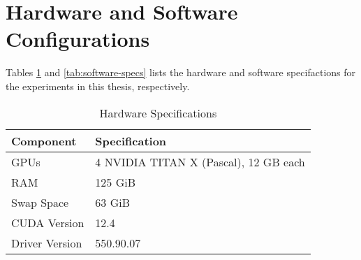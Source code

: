 

\section{Hardware and Software Configurations}
\label{sec:hardware_software}
Tables \ref{tab:hardware-specs} and \ref{tab:software-specs} lists the hardware and software specifactions for the experiments in this thesis, respectively.

\begin{table}[h!]
    \centering
    \caption{Hardware Specifications}
    \small
    \begin{tabular}{|l|l|}
    \hline
    \textbf{Component}        & \textbf{Specification}                  \\ \hline
    GPUs                      & 4 NVIDIA TITAN X (Pascal), 12 GB each   \\ \hline
    RAM                       & 125 GiB                                \\ \hline
    Swap Space                & 63 GiB                                 \\ \hline
    CUDA Version              & 12.4                                   \\ \hline
    Driver Version            & 550.90.07                              \\ \hline
    \end{tabular}
    \label{tab:hardware-specs}
    \end{table}
    



